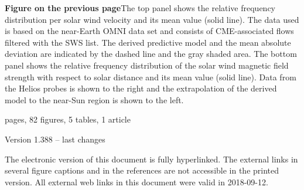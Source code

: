 \newpage

\vspace*{\fill}
\begin{small}
	\noindent \textbf{Figure on the previous page}\quad The top panel shows the relative \Kp{} frequency distribution per solar wind velocity and its mean value (solid line). The data used is based on the near-Earth OMNI data set and consists of CME-associated flows filtered with the SWS list. The derived predictive model and the mean absolute deviation are indicated by the dashed line and the gray shaded area.
	The bottom panel shows the relative frequency distribution of the solar wind magnetic field strength with respect to solar distance and its mean value (solid line). Data from the Helios probes is shown to the right and the extrapolation of the derived model to the near-Sun region is shown to the left.



	
	\vspace{1\baselineskip}
	
	 pages, 82 figures, 5 tables, 1 article

	\noindent Version 1.388 -- last changes \ISOToday{} \thistime{}
	
	\vspace{1\baselineskip}
	
	\noindent The electronic version of this document is fully hyperlinked. The external links in several figure captions and in the references are not accessible in the printed version. All external web links in this document were valid in 2018-09-12.
\end{small}

\normalsize


